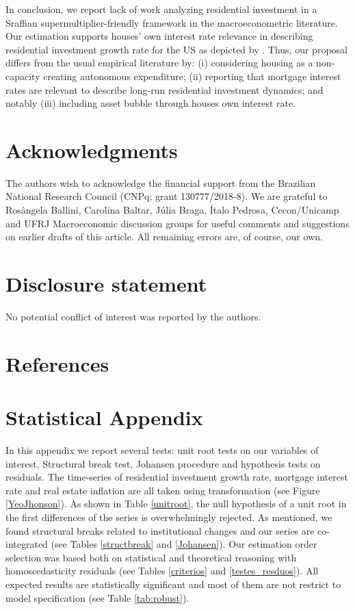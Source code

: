 \documentclass[12pt, a4paper]{article}
\begin{document}
In conclusion,  we report lack of work analyzing residential investment in a Sraffian supermultiplier-friendly framework in the macroeconometric literature.
Our estimation supports houses' own interest rate relevance in describing residential investment growth rate for the US as depicted by \textcite{teixeira_crescimento_2015}.
Thus, our  proposal differs from the usual empirical literature by:
	(i) considering housing as a non-capacity creating autonomous expenditure;
	(ii) reporting that mortgage interest rates are relevant to describe long-run residential investment dynamics; and notably 
	(iii) including asset bubble through houses own interest rate.


\section*{Acknowledgments}
\label{sec:org030c0d1}
\noindent The authors wish to acknowledge the financial support from the Brazilian National Research Council (CNPq; grant 130777/2018-8). We are grateful to Rosângela Ballini, Carolina Baltar, Júlia Braga, Ítalo Pedrosa, Cecon/Unicamp and UFRJ Macroeconomic discussion groups for useful comments and suggestions on earlier drafts of this article. All remaining errors are, of course, our own.


\section*{Disclosure statement}
\label{sec:orge9898e7}
No potential conflict of interest was reported by the authors.

\section*{References}
\label{sec:orga37638a}
\printbibliography[heading=none]


\appendix
\section{Statistical Appendix}
\label{sec:org2549d24}
\label{appen:A}

In this appendix we report several tests: unit root tests on our variables of interest, Structural break test, Johansen procedure and hypothesis tests on residuals. 
The time-series of residential investment growth rate, mortgage interest rate and real estate inflation are all taken using \textcite{yeo_new_2000} transformation (see Figure \ref{YeoJhonson}).
As shown in Table \ref{unitroot}, the null hypothesis of a unit root in the first differences of the series is overwhelmingly rejected.
As mentioned, we found structural breaks related to institutional changes and our series are co-integrated (see Tables \ref{structbreak} and \ref{Johansen}).
Our estimation order selection was based both on statistical and theoretical reasoning with homoscedasticity residuals (see Tables \ref{criterios} and \ref{testes_resduos}).
All expected results are statistically significant and most of them are not restrict to model specification (see Table \ref{tab:robust}).
\end{document}
